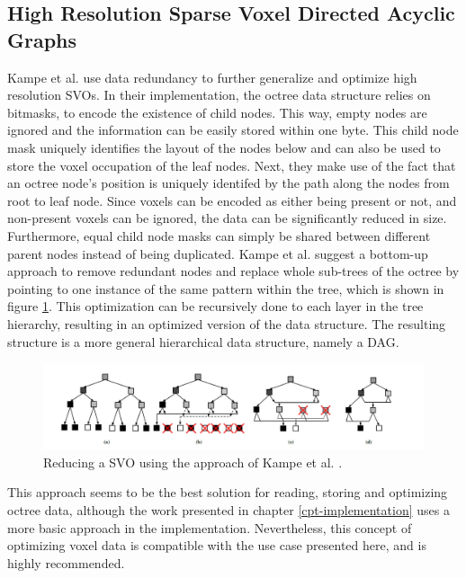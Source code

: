\subsection*{High Resolution Sparse Voxel Directed Acyclic Graphs} \label{subsec-highres-svo-dags}

Kampe et al. \cite{Kampe2013} use data redundancy to further generalize and optimize high resolution 
\ac{SVO}s. In their implementation, the octree data structure relies on bitmasks, to encode the existence of child 
nodes. This way, empty nodes are ignored and the information can be easily stored within one byte. This child node 
mask uniquely identifies the layout of the nodes below and can also be used to store the voxel occupation of the 
leaf nodes. Next, they make use of the fact that an octree node's position is uniquely identifed by the path along 
the nodes from root to leaf node. Since voxels can be encoded as either being present or not, and non-present 
voxels can be ignored, the data can be significantly reduced in size. Furthermore, equal child node masks 
can simply be shared between different parent nodes instead of being duplicated. Kampe et al. \cite{Kampe2013} 
suggest a bottom-up approach to remove redundant nodes and replace whole sub-trees of the octree by pointing to one 
instance of the same pattern within the tree, which is shown in figure \ref{fig:sparse-voxel-dag-creation}. 
This optimization can be recursively done to each layer in the tree hierarchy, resulting in an optimized version 
of the data structure. The resulting structure is a more general hierarchical data structure, namely a \ac{DAG}.

\begin{figure}[h]
    \centering
    \includegraphics[width=\linewidth]{images/graphics/highres-sv-dag.jpg}
    \caption{Reducing a \ac{SVO} using the approach of Kampe et al. \cite{Kampe2013}.}
    \label{fig:sparse-voxel-dag-creation}
\end{figure}

\noindent
This approach seems to be the best solution for reading, storing and optimizing octree data, although the work
presented in chapter \ref{cpt-implementation} uses a more basic approach in the implementation. Nevertheless, 
this concept of optimizing voxel data is compatible with the use case presented here, and is highly recommended.


